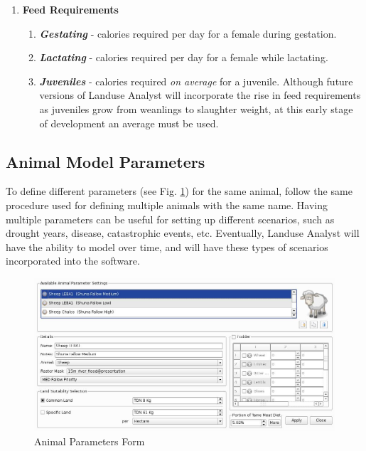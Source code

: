 \begin{enumerate}
    \item \textbf{Feed Requirements}
      \begin{enumerate}
        \item  \textit{\textbf{Gestating}} - calories required per
day for a female during gestation.
        \item  \textit{\textbf{Lactating}} - calories required per
day for a female while lactating.
        \item  \textit{\textbf{Juveniles}} - calories required
\textit{on average} for a juvenile.  Although future versions of Landuse Analyst
will incorporate the rise in feed requirements as juveniles grow from weanlings
to slaughter weight, at this early stage of development an average must be used.
      \end{enumerate}
  \end{enumerate}

  \subsection{Animal Model Parameters}
To define different parameters (see Fig. \ref{fig:animalParameters}) for the
same animal, follow the same procedure used for defining multiple animals with
the same name. Having multiple parameters can be useful for setting up different
scenarios, such as drought years, disease, catastrophic events, etc. Eventually,
Landuse Analyst will have the ability to model over time, and will have these
types of scenarios incorporated into the software.

\begin{figure}[htbp]
    \includegraphics[scale=.23]{./images/animalParameters.jpg}
  \caption{\label{fig:animalParameters}Animal Parameters Form}
\end{figure}


